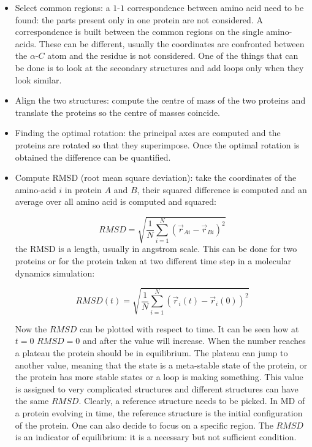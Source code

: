 		\begin{itemize}
			\item Select common regions: a $1$-$1$ correspondence between amino acid need to be found: the parts present only in one protein are not considered.
				A correspondence is built between the common regions on the single amino-acids.
				These can be different, usually the coordinates are confronted between the $\alpha$-$C$ atom and the residue is not considered.
				One of the things that can be done is to look at the secondary structures and add loops only when they look similar.
			\item Align the two structures: compute the centre of mass of the two proteins and translate the proteins so the centre of masses coincide.
			\item Finding the optimal rotation: the principal axes are computed and the proteins are rotated so that they superimpose.
				Once the optimal rotation is obtained the difference can be quantified.
			\item Compute RMSD (root mean square deviation): take the coordinates of the amino-acid $i$ in protein $A$ and $B$, their squared difference is computed and an average over all amino acid is computed and squared:

				$$RMSD = \sqrt{\frac{1}{N}\sum\limits_{i=1}^N(\vec{r}_{Ai}-\vec{r}_{Bi})^2}$$
				the RMSD is a length, usually in angstrom scale.
				This can be done for two proteins or for the protein taken at two different time step in a molecular dynamics simulation:

				$$RMSD(t) = \sqrt{\frac{1}{N}\sum\limits_{i=1}^N(\vec{r}_{i}(t)-\vec{r}_{i}(0))^2}$$

				Now the $RMSD$ can be plotted with respect to time.
				It can be seen how at $t=0$ $RMSD=0$ and after the value will increase.
				When the number reaches a plateau the protein should be in equilibrium.
				The plateau can jump to another value, meaning that the state is a meta-stable state of the protein, or the protein has more stable states or a loop is making something.
				This value is assigned to very complicated structures and different structures can have the same $RMSD$.
				Clearly, a reference structure needs to be picked.
				In MD of a protein evolving in time, the reference structure is the initial configuration of the protein.
				One can also decide to focus on a specific region.
				The $RMSD$ is an indicator of equilibrium: it is a necessary but not sufficient condition.
		\end{itemize}

